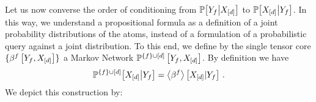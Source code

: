%	



%		
%


Let us now converse the order of conditioning from $\mathbb{P}\big[Y_{f}\big|X_{[d]}\big]$ to $\mathbb{P}\big[X_{[d]}\big|Y_{f}\big]$.
In this way, we understand a propositional formula as a definition of a joint probability distributions of the atoms, instead of a formulation of a probabilistic query against a joint distribution.
To this end, we define by the single tensor core $\{\beta^{f}\left[Y_{f},X_{[d]}\right]\}$ a Markov Network $\mathbb{P}^{\{f\}\cup[d]}\left[Y_{f},X_{[d]}\right]$.
By definition we have
\begin{align*}
    \mathbb{P}^{\{f\}\cup[d]}\big[X_{[d]}\big|Y_{f}\big]
    = \left\langle \beta^{f}\right\rangle \left[ X_{[d]} | Y_{f} \right] \, .
\end{align*}
We depict this construction by:
\begin{center}
    
\end{center}

